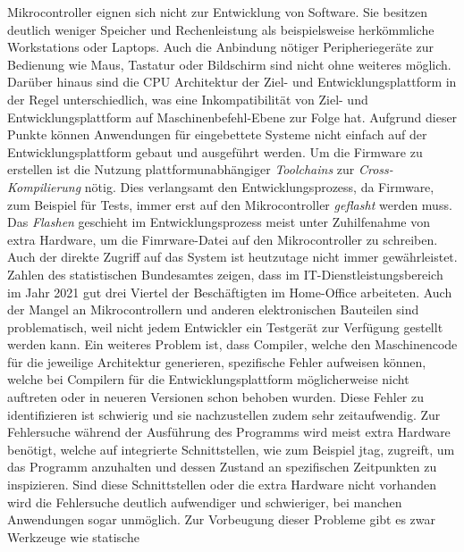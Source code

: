 Mikrocontroller eignen sich nicht zur Entwicklung von Software.
Sie besitzen deutlich weniger Speicher und Rechenleistung als beispielsweise
herkömmliche Workstations oder Laptops.
Auch die Anbindung nötiger Peripheriegeräte zur Bedienung wie Maus, Tastatur
oder Bildschirm sind nicht ohne weiteres möglich.
Darüber hinaus sind die CPU Architektur der Ziel- und Entwicklungsplattform in
der Regel unterschiedlich, was eine Inkompatibilität von Ziel- und
Entwicklungsplattform auf Maschinenbefehl-Ebene zur Folge hat.\newline
Aufgrund dieser Punkte können Anwendungen für eingebettete Systeme nicht
einfach auf der Entwicklungsplattform gebaut und ausgeführt werden.
Um die Firmware zu erstellen ist die Nutzung plattformunabhängiger
\textit{Toolchains} zur \textit{Cross-Kompilierung} nötig.
Dies verlangsamt den Entwicklungsprozess, da Firmware, zum Beispiel für Tests,
immer erst auf den Mikrocontroller \textit{geflasht} werden muss.
Das \textit{Flashen} geschieht im Entwicklungsprozess meist unter Zuhilfenahme
von extra Hardware, um die Fimrware-Datei auf den Mikrocontroller zu
schreiben.\newline
Auch der direkte Zugriff auf das System ist heutzutage nicht immer
gewährleistet.
Zahlen des statistischen Bundesamtes zeigen, dass im IT-Dienstleistungsbereich
im Jahr 2021 gut drei Viertel der Beschäftigten im Home-Office
arbeiteten\cite{DestatisHomeOffice}.
Auch der Mangel an Mikrocontrollern und anderen elektronischen Bauteilen sind
problematisch, weil nicht jedem Entwickler ein Testgerät zur Verfügung gestellt
werden kann.\newline
Ein weiteres Problem ist, dass Compiler, welche den Maschinencode für die
jeweilige Architektur generieren, spezifische Fehler aufweisen können, welche
bei Compilern für die Entwicklungsplattform möglicherweise nicht
auftreten\cite{DebGccBug}\cite{LaunchpadGccBug} oder in neueren Versionen schon
behoben wurden.
Diese Fehler zu identifizieren ist schwierig und sie nachzustellen zudem
sehr zeitaufwendig.\newline
Zur Fehlersuche während der Ausführung des Programms wird meist extra Hardware
benötigt, welche auf integrierte Schnittstellen, wie zum Beispiel \ac{jtag},
zugreift, um das Programm anzuhalten und dessen Zustand an spezifischen
Zeitpunkten zu inspizieren.
Sind diese Schnittstellen oder die extra Hardware nicht vorhanden wird die
Fehlersuche deutlich aufwendiger und schwieriger, bei manchen Anwendungen sogar
unmöglich.
Zur Vorbeugung dieser Probleme gibt es zwar Werkzeuge wie statische

